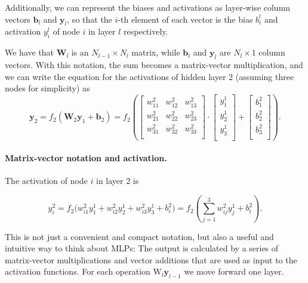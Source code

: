 \documentclass[%
oneside,                 %
final,                   %
10pt]{article}
\begin{document}
Additionally, we can represent the biases and activations
as layer-wise column vectors $\boldsymbol{b}_l$ and $\boldsymbol{y}_l$, so that the $i$-th element of each vector 
is the bias $b_i^l$ and activation $y_i^l$ of node $i$ in layer $l$ respectively. 

We have that $\boldsymbol{W}_l$ is an $N_{l-1} \times N_l$ matrix, while $\boldsymbol{b}_l$ and $\boldsymbol{y}_l$ are $N_l \times 1$ column vectors. 
With this notation, the sum becomes a matrix-vector multiplication, and we can write
the equation for the activations of hidden layer 2 (assuming three nodes for simplicity) as
\begin{equation}
 \boldsymbol{y}_2 = f_2(\boldsymbol{W}_2 \boldsymbol{y}_{1} + \boldsymbol{b}_{2}) = 
 f_2\left(\left[\begin{array}{ccc}
    w^2_{11} &w^2_{12} &w^2_{13} \\
    w^2_{21} &w^2_{22} &w^2_{23} \\
    w^2_{31} &w^2_{32} &w^2_{33} \\
    \end{array} \right] \cdot
    \left[\begin{array}{c}
           y^1_1 \\
           y^1_2 \\
           y^1_3 \\
          \end{array}\right] + 
    \left[\begin{array}{c}
           b^2_1 \\
           b^2_2 \\
           b^2_3 \\
          \end{array}\right]\right).
\end{equation}

\paragraph{Matrix-vector notation  and activation.}
The activation of node $i$ in layer 2 is

\begin{equation}
 y^2_i = f_2\Bigr(w^2_{i1}y^1_1 + w^2_{i2}y^1_2 + w^2_{i3}y^1_3 + b^2_i\Bigr) = 
 f_2\left(\sum_{j=1}^3 w^2_{ij} y_j^1 + b^2_i\right).
\end{equation}

This is not just a convenient and compact notation, but also a useful
and intuitive way to think about MLPs: The output is calculated by a
series of matrix-vector multiplications and vector additions that are
used as input to the activation functions. For each operation
$\mathrm{W}_l \boldsymbol{y}_{l-1}$ we move forward one layer.
\end{document}
